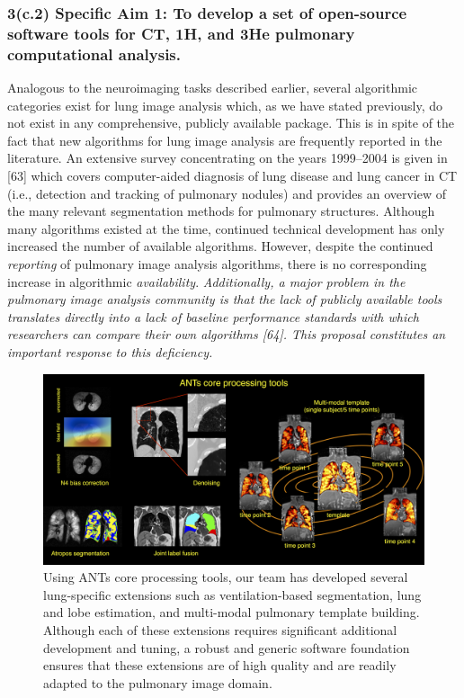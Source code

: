 \documentclass[11pt,]{article}
\begin{document}
\subsubsection{3(c.2) \textbf{Specific Aim 1:} To develop a set of
open-source software tools for CT, 1H, and 3He pulmonary computational
analysis.}\label{c.2-specific-aim-1-to-develop-a-set-of-open-source-software-tools-for-ct-1h-and-3he-pulmonary-computational-analysis.}

Analogous to the neuroimaging tasks described earlier, several
algorithmic categories exist for lung image analysis which, as we have
stated previously, do not exist in any comprehensive, publicly available
package. This is in spite of the fact that new algorithms for lung image
analysis are frequently reported in the literature. An extensive survey
concentrating on the years 1999--2004 is given in {[}63{]} which covers
computer-aided diagnosis of lung disease and lung cancer in CT (i.e.,
detection and tracking of pulmonary nodules) and provides an overview of
the many relevant segmentation methods for pulmonary structures.
Although many algorithms existed at the time, continued technical
development has only increased the number of available algorithms.
However, despite the continued \emph{reporting} of pulmonary image
analysis algorithms, there is no corresponding increase in algorithmic
\emph{availability}. \emph{Additionally, a major problem in the
pulmonary image analysis community is that the lack of publicly
available tools translates directly into a lack of baseline performance
standards with which researchers can compare their own algorithms
{[}64{]}. This proposal constitutes an important response to this
deficiency.}

\begin{figure}[htbp]
\centering
\includegraphics{Figs/coreANtsToolsLung.png}
\caption{Using ANTs core processing tools, our team has developed
several lung-specific extensions such as ventilation-based segmentation,
lung and lobe estimation, and multi-modal pulmonary template building.
Although each of these extensions requires significant additional
development and tuning, a robust and generic software foundation ensures
that these extensions are of high quality and are readily adapted to the
pulmonary image domain.}
\end{figure}
\end{document}
